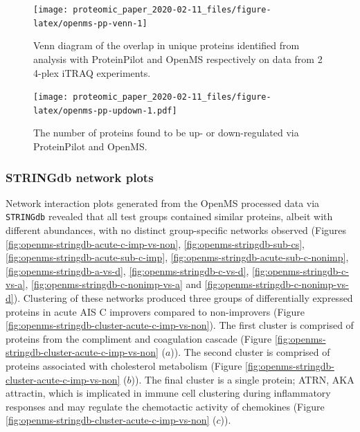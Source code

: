\documentclass[
]{article}
\begin{document}
\begin{figure}

{\centering \texttt{[image: proteomic\_paper\_2020-02-11\_files/figure-latex/openms-pp-venn-1]} 

}

\caption{Venn diagram of the overlap in unique proteins identified from analysis with ProteinPilot and OpenMS respectively on data from 2 4-plex iTRAQ experiments.}\label{fig:openms-pp-venn}
\end{figure}



\begin{figure}
\centering
\texttt{[image: proteomic\_paper\_2020-02-11\_files/figure-latex/openms-pp-updown-1.pdf]}
\caption{\label{fig:openms-pp-updown}The number of proteins found to be up- or down-regulated via ProteinPilot and OpenMS.}
\end{figure}

\clearpage

\hypertarget{stringdb-network-plots}{%
\subsubsection{STRINGdb network plots}\label{stringdb-network-plots}}

Network interaction plots generated from the OpenMS processed data via \texttt{STRINGdb} revealed that all test groups contained similar proteins, albeit with different abundances, with no distinct group-specific networks observed (Figures \ref{fig:openms-stringdb-acute-c-imp-vs-non}, \ref{fig:openms-stringdb-sub-cs}, \ref{fig:openms-stringdb-acute-sub-c-imp}, \ref{fig:openms-stringdb-acute-sub-c-nonimp}, \ref{fig:openms-stringdb-a-vs-d}, \ref{fig:openms-stringdb-c-vs-d}, \ref{fig:openms-stringdb-c-vs-a}, \ref{fig:openms-stringdb-c-nonimp-vs-a} and \ref{fig:openms-stringdb-c-nonimp-vs-d}).
Clustering of these networks produced three groups of differentially expressed proteins in acute AIS C improvers compared to non-improvers (Figure \ref{fig:openms-stringdb-cluster-acute-c-imp-vs-non}).
The first cluster is comprised of proteins from the compliment and coagulation cascade (Figure \ref{fig:openms-stringdb-cluster-acute-c-imp-vs-non} (\(a\))).
The second cluster is comprised of proteins associated with cholesterol metabolism (Figure \ref{fig:openms-stringdb-cluster-acute-c-imp-vs-non} (\(b\))).
The final cluster is a single protein; ATRN, AKA attractin, which is implicated in immune cell clustering during inflammatory responses and may regulate the chemotactic activity of chemokines (Figure \ref{fig:openms-stringdb-cluster-acute-c-imp-vs-non} (\(c\))).
\end{document}
